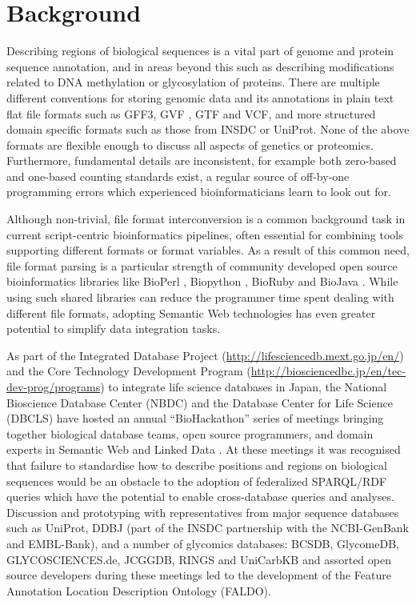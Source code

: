 \section*{Background}
Describing regions of biological sequences is a vital part of genome and protein sequence
annotation, and in areas beyond this such as describing modifications related to DNA methylation
or glycosylation of proteins.
There are multiple different conventions for storing genomic data and its annotations in
plain text flat file formats such as GFF3, GVF \cite{GVF}, GTF and VCF,
and more structured domain specific formats such as those from INSDC or UniProt.
None of the above formats are flexible enough to discuss all aspects of genetics or proteomics. 
Furthermore, fundamental details are inconsistent, for example both zero-based and
one-based counting standards exist, a regular source of off-by-one programming
errors which experienced bioinformaticians learn to look out for.

Although non-trivial, file format interconversion is a common background task
in current script-centric bioinformatics pipelines, often essential for combining
tools supporting different formats or format variables.
As a result of this common need, file format parsing is a particular strength of
community developed open source bioinformatics libraries like BioPerl
\cite{BioPerl2002}, Biopython \cite{Biopython2009}, BioRuby \cite{BioRuby2010}
and BioJava \cite{BioJava2012}. While using such shared libraries can reduce the
programmer time spent dealing with different file formats, adopting Semantic
Web technologies has even greater potential to simplify data integration tasks.

As part of the Integrated Database Project (\url{http://lifesciencedb.mext.go.jp/en/}) and
the Core Technology Development Program (\url{http://biosciencedbc.jp/en/tec-dev-prog/programs})
to integrate life science databases in Japan, the National Bioscience Database Center (NBDC) and the Database
Center for Life Science (DBCLS) have hosted an annual ``BioHackathon'' series
of meetings bringing together biological database teams, open source programmers,
and domain experts in Semantic Web and Linked Data \cite{BioHack2010,BioHack2011and2012}.
At these meetings it was recognised that failure to standardise how to describe positions
and regions on biological sequences would be an obstacle to the adoption of federalized
SPARQL/RDF queries which have the potential to enable cross-database queries and
analyses. Discussion and prototyping with representatives from major sequence databases
such as UniProt\cite{UniProt2013}, DDBJ\cite{DDBJ2013} (part of the INSDC partnership with the NCBI-GenBank\cite{GenBank2013} and EMBL-Bank\cite{ENA2013}),
and a number of glycomics databases: 
BCSDB\cite{doi:10.1021/ci100150d}, GlycomeDB\cite{Ranzinger01012011}, GLYCOSCIENCES.de\cite{Lutteke01052006}, JCGGDB, RINGS\cite{RINGS} and UniCarbKB\cite{UniCarbKB} and assorted open source developers during these meetings
led to the development of the Feature Annotation Location Description Ontology (FALDO).

